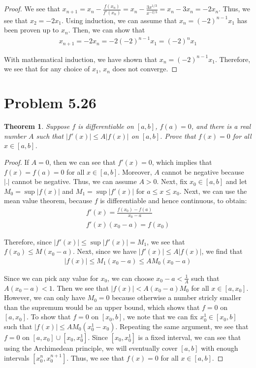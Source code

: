 \documentclass[psamsfonts]{amsart}
\newtheorem{thm}{Theorem}[section]
\theoremstyle{definition}
\theoremstyle{remark}
\numberwithin{equation}{section}
\begin{document}
\begin{proof}
We see that $x_{n+1} = x_n - \frac{f(x_n)}{f'(x_n)} = x_n - \frac{3 x^{1/3}}{ x^{-2/3}} = x_n - 3 x_n = - 2x_n$. Thus, we see that $x_2 = -2 x_1$. Using induction, we can assume that $x_n = (-2)^{n-1} x_1$ has been proven up to $x_n$. Then, we can show that
\begin{eqnarray}
x_{n+1} = -2 x_n = -2 (-2)^{n-1} x_1 = (-2)^{n} x_1
\end{eqnarray}

With mathematical induction, we have shown that $x_n = (-2)^{n-1} x_1$. Therefore, we see that for any choice of $x_1$, $x_n$ does not converge. 
\end{proof}

\section{Problem 5.26}

\begin{thm}
Suppose $f$ is differentiable on $[a,b]$, $f(a) = 0$, and there is a real number $A$ such that $|f'(x)| \leq A |f(x)|$ on $[a,b]$. Prove that $f(x) = 0$ for all $x \in [a,b]$. 
\end{thm}

\begin{proof}
If $A = 0$, then we can see that $f'(x) = 0$, which implies that $f(x) = f(a) = 0$ for all $x \in [a,b]$. Moreover, $A$ cannot be negative because $|.|$ cannot be negative. Thus, we can assume $A > 0$. Next, fix $x_0 \in [a,b]$ and let $M_0 = \sup |f(x)|$ and $M_1 = \sup |f'(x)|$ for $a \leq x \leq x_0$. Next, we can use the mean value theorem, because $f$ is differentiable and hence continuous, to obtain:
\begin{eqnarray}
f'(x) = \frac{f(x_0) - f(a)}{x_0 - a} \\
f'(x) (x_0 - a) = f(x_0)
\end{eqnarray}

Therefore, since $|f'(x)| \leq \sup |f'(x)| = M_1$, we see that $f(x_0) \leq M (x_0 - a)$. Next, since we have $|f'(x)| \leq A |f(x)|$, we find that
\begin{eqnarray}
|f(x)| \leq M_1 (x_0 - a) \leq A M_0 (x_0 - a)
\end{eqnarray}

Since we can pick any value for $x_0$, we can choose $x_0 -  a < \frac{1}{A}$ such that $A(x_0 - a) < 1$. Then we see that $|f(x)| < A(x_0 - a) M_0$ for all $x \in [a,x_0]$. However, we can only have $M_0 = 0$ because otherwise a number stricly smaller than the supremum would be an upper bound, which shows that $f = 0$ on $[a,x_0]$. To show that $f= 0$ on $[x_0,b]$, we note that we can fix $x_0^1 \in [x_0, b]$ such that $|f(x)| \leq A M_0 (x_0^1 - x_0)$. Repeating the same argument, we see that $f = 0$ on $[a,x_0] \cup [x_0, x_0^1]$. Since $[x_0, x_0^1]$ is a fixed interval, we can see that using the Archimedean principle, we will eventually cover $[a,b]$ with enough intervals $[x_0^{n}, x_0^{n+1}]$. Thus, we see that $f(x) = 0$ for all $x \in [a,b]$. 
\end{proof}
\end{document}
